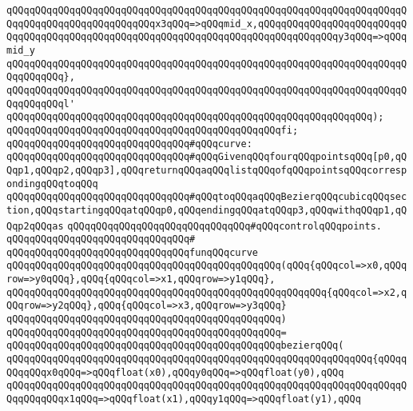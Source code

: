 \verb|qQQqqQQqqQQqqQQqqQQqqQQqqQQqqQQqqQQqqQQqqQQqqQQqqQQqqQQqqQQqqQQqqQQqqQQqqQQqqQQqqQQqqQQqqQQqqQQqx3qQQq=>qQQqmid_x,qQQqqQQqqQQqqQQqqQQqqQQqqQQqqQQqqQQqqQQqqQQqqQQqqQQqqQQqqQQqqQQqqQQqqQQqqQQqqQQqqQQqy3qQQq=>qQQqmid_y|\newline
\verb|qQQqqQQqqQQqqQQqqQQqqQQqqQQqqQQqqQQqqQQqqQQqqQQqqQQqqQQqqQQqqQQqqQQqqQQqqQQqqQQq},|\newline
\verb|qQQqqQQqqQQqqQQqqQQqqQQqqQQqqQQqqQQqqQQqqQQqqQQqqQQqqQQqqQQqqQQqqQQqqQQqqQQqqQQql'|\newline
\verb|qQQqqQQqqQQqqQQqqQQqqQQqqQQqqQQqqQQqqQQqqQQqqQQqqQQqqQQqqQQqqQQq);|\newline
\newline
\verb|qQQqqQQqqQQqqQQqqQQqqQQqqQQqqQQqqQQqqQQqqQQqqQQqfi;|\newline
\newline
\verb|qQQqqQQqqQQqqQQqqQQqqQQqqQQqqQQq#qQQqcurve:|\newline
\verb|qQQqqQQqqQQqqQQqqQQqqQQqqQQqqQQq#qQQqGivenqQQqfourqQQqpointsqQQq[p0,qQQqp1,qQQqp2,qQQqp3],qQQqreturnqQQqaqQQqlistqQQqofqQQqpointsqQQqcorrespondingqQQqtoqQQq|\newline
\verb|qQQqqQQqqQQqqQQqqQQqqQQqqQQqqQQq#qQQqtoqQQqaqQQqBezierqQQqcubicqQQqsection,qQQqstartingqQQqatqQQqp0,qQQqendingqQQqatqQQqp3,qQQqwithqQQqp1,qQQqp2qQQqas|\newline
\verb|qQQqqQQqqQQqqQQqqQQqqQQqqQQqqQQq#qQQqcontrolqQQqpoints.|\newline
\verb|qQQqqQQqqQQqqQQqqQQqqQQqqQQqqQQq#|\newline
\verb|qQQqqQQqqQQqqQQqqQQqqQQqqQQqqQQqfunqQQqcurve|\newline
\verb|qQQqqQQqqQQqqQQqqQQqqQQqqQQqqQQqqQQqqQQqqQQqqQQq(qQQq{qQQqcol=>x0,qQQqrow=>y0qQQq},qQQq{qQQqcol=>x1,qQQqrow=>y1qQQq},|\newline
\verb|qQQqqQQqqQQqqQQqqQQqqQQqqQQqqQQqqQQqqQQqqQQqqQQqqQQqqQQq{qQQqcol=>x2,qQQqrow=>y2qQQq},qQQq{qQQqcol=>x3,qQQqrow=>y3qQQq}|\newline
\verb|qQQqqQQqqQQqqQQqqQQqqQQqqQQqqQQqqQQqqQQqqQQqqQQq)|\newline
\verb|qQQqqQQqqQQqqQQqqQQqqQQqqQQqqQQqqQQqqQQqqQQqqQQq=|\newline
\verb|qQQqqQQqqQQqqQQqqQQqqQQqqQQqqQQqqQQqqQQqqQQqqQQqbezierqQQq(|\newline
\verb|qQQqqQQqqQQqqQQqqQQqqQQqqQQqqQQqqQQqqQQqqQQqqQQqqQQqqQQqqQQqqQQq{qQQqqQQqqQQqx0qQQq=>qQQqfloat(x0),qQQqy0qQQq=>qQQqfloat(y0),qQQq|\newline
\verb|qQQqqQQqqQQqqQQqqQQqqQQqqQQqqQQqqQQqqQQqqQQqqQQqqQQqqQQqqQQqqQQqqQQqqQQqqQQqqQQqx1qQQq=>qQQqfloat(x1),qQQqy1qQQq=>qQQqfloat(y1),qQQq|\newline
